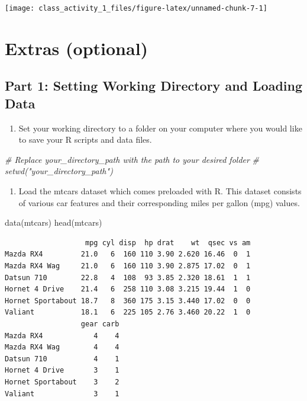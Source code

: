\documentclass[
]{book}
\newenvironment{Shaded}{\begin{snugshade}}{\end{snugshade}}
\newcommand{\CommentTok}[1]{\textcolor[rgb]{0.56,0.35,0.01}{\textit{#1}}}
\newcommand{\FunctionTok}[1]{\textcolor[rgb]{0.00,0.00,0.00}{#1}}
\newcommand{\NormalTok}[1]{#1}
\providecommand{\tightlist}{%
  \setlength{\itemsep}{0pt}\setlength{\parskip}{0pt}}
\begin{document}
\texttt{[image: class\_activity\_1\_files/figure-latex/unnamed-chunk-7-1]}

\hypertarget{extras-optional}{%
\section{Extras (optional)}\label{extras-optional}}

\hypertarget{part-1-setting-working-directory-and-loading-data}{%
\subsection{Part 1: Setting Working Directory and Loading Data}\label{part-1-setting-working-directory-and-loading-data}}

\begin{enumerate}
\def\labelenumi{\arabic{enumi}.}
\tightlist
\item
  Set your working directory to a folder on your computer where you would like to save your R scripts and data files.
\end{enumerate}

\begin{Shaded}
\begin{Highlighting}[]
\CommentTok{\# Replace \textquotesingle{}your\_directory\_path\textquotesingle{} with the path to your desired folder}
\CommentTok{\# setwd("your\_directory\_path")}
\end{Highlighting}
\end{Shaded}

\begin{enumerate}
\def\labelenumi{\arabic{enumi}.}
\setcounter{enumi}{1}
\tightlist
\item
  Load the mtcars dataset which comes preloaded with R. This dataset consists of various car features and their corresponding miles per gallon (mpg) values.
\end{enumerate}

\begin{Shaded}
\begin{Highlighting}[]
\FunctionTok{data}\NormalTok{(mtcars)}
\FunctionTok{head}\NormalTok{(mtcars)}
\end{Highlighting}
\end{Shaded}

\begin{verbatim}
                   mpg cyl disp  hp drat    wt  qsec vs am
Mazda RX4         21.0   6  160 110 3.90 2.620 16.46  0  1
Mazda RX4 Wag     21.0   6  160 110 3.90 2.875 17.02  0  1
Datsun 710        22.8   4  108  93 3.85 2.320 18.61  1  1
Hornet 4 Drive    21.4   6  258 110 3.08 3.215 19.44  1  0
Hornet Sportabout 18.7   8  360 175 3.15 3.440 17.02  0  0
Valiant           18.1   6  225 105 2.76 3.460 20.22  1  0
                  gear carb
Mazda RX4            4    4
Mazda RX4 Wag        4    4
Datsun 710           4    1
Hornet 4 Drive       3    1
Hornet Sportabout    3    2
Valiant              3    1
\end{verbatim}
\end{document}
